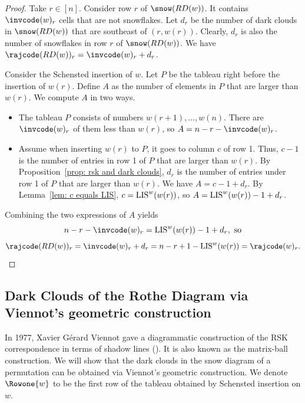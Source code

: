 \begin{proof}
Take $r \in [n]$.
Consider row $r$ of $\snow(RD(w))$.
It contains $\invcode(w)_r$ cells that are not snowflakes. 
Let $d_r$ be the number of dark clouds in $\snow(RD(w))$ 
that are southeast of $(r,w(r))$.
Clearly, $d_r$ is also the number of snowflakes in row $r$ of $\snow(RD(w))$.
We have $\rajcode(RD(w))_r = \invcode(w)_r + d_r$.

Consider the Schensted insertion of $w$.
Let $P$ be the tableau right before the insertion of $w(r)$.
Define $A$ as the number of elements
in $P$ that are larger than $w(r)$.
We compute $A$ in two ways. 
\begin{itemize}
\item The tableau $P$
consists of numbers 
$w(r+1), \dots, w(n)$.
There are $\invcode(w)_r$ of them 
less than $w(r)$,
so $A = n - r - \invcode(w)_r$.
\item
Assume when inserting $w(r)$ to $P$,
it goes to column $c$ of row 1. 
Thus,  
$c-1$ is the number of entries in row 1
of $P$ that are larger than $w(r)$.
By Proposition~\ref{prop: rsk and dark clouds},
$d_r$ is the number of entries 
under row 1 of $P$
that are larger than $w(r)$.
We have $A = c - 1 + d_r$.
By Lemma~\ref{lem: c equals LIS},
$c = \textup{LIS}^w(w(r))$,
so $A = \textup{LIS}^w(w(r)) - 1 + d_r$.
\end{itemize}

Combining the two expressions of $A$ 
yields
$$
 n - r - \invcode(w)_r = \textup{LIS}^w(w(r)) - 1 + d_r, \textrm{ so}
$$
$$
\rajcode(RD(w))_r = \invcode(w)_r + d_r
= n - r + 1 - \textup{LIS}^w(w(r))
= \rajcode(w)_r.
$$
\end{proof}


\subsection{Dark Clouds of the Rothe Diagram via Viennot's geometric construction}
\label{subsec.shadow.diagram}
In 1977, Xavier G{\'e}rard Viennot gave a diagrammatic construction of the RSK correspondence 
in terms of shadow lines (\cite{viennot}). It is also known as the matrix-ball construction. We will show that the dark clouds in the snow diagram of a permutation can be obtained via Viennot's geometric construction. 
We denote $\Rowone{w}$ to be the first row of the tableau obtained by Schensted insertion on $w$.


